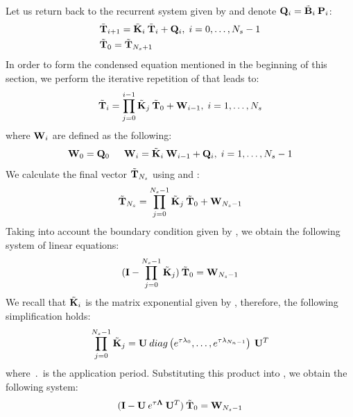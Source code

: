  \label{sec:ce-solution}
Let us return back to the recurrent system given by  and denote \mbox{$\mathbf{Q}_i = \tilde{\mathbf{B}}_i \: \mathbf{P}_i$}:
\begin{align}
  & \tilde{\mathbf{T}}_{i + 1} = \tilde{\mathbf{K}}_i \: \tilde{\mathbf{T}}_i + \mathbf{Q}_i, \; i = 0, \dots, N_s - 1 \label{eq:ce-recurrent} \\
  & \tilde{\mathbf{T}}_0 = \tilde{\mathbf{T}}_{N_s + 1} \nonumber
\end{align}
In order to form the condensed equation mentioned in the beginning of this section, we perform the iterative repetition of  that leads to:
\begin{equation} \label{eq:y-recurrent}
  \tilde{\mathbf{T}}_i = \prod_{j = 0}^{i - 1} \tilde{\mathbf{K}}_j \: \tilde{\mathbf{T}}_0 + \mathbf{W}_{i - 1}, \; i = 1, \dots, N_s
\end{equation}
where $\mathbf{W}_i$ are defined as the following:
\begin{equation}
  \mathbf{W}_0 = \mathbf{Q}_0 \hspace{15pt} \mathbf{W}_i = \tilde{\mathbf{K}}_i \: \mathbf{W}_{i - 1} + \mathbf{Q}_i, \; i = 1, \dots, N_s - 1 \label{eq:p-recurrent}
\end{equation}
We calculate the final vector $\tilde{\mathbf{T}}_{N_s}$ using  and :
\[
  \tilde{\mathbf{T}}_{N_s} = \prod_{j = 0}^{N_s - 1} \tilde{\mathbf{K}}_j \: \tilde{\mathbf{T}}_0 + \mathbf{W}_{N_s - 1}
\]
Taking into account the boundary condition given by , we obtain the following system of linear equations:
\begin{equation} \label{eq:core-system}
  (\mathbf{I} - \prod_{j = 0}^{N_s - 1} \tilde{\mathbf{K}}_j) \: \tilde{\mathbf{T}}_0 = \mathbf{W}_{N_s - 1}
\end{equation}
We recall that $\tilde{\mathbf{K}}_i$ is the matrix exponential given by , therefore, the following simplification holds:
\[
  \prod_{j = 0}^{N_s - 1} \tilde{\mathbf{K}}_j = \mathbf{U} \: diag \left( e^{\tau \lambda_0}, \dots, e^{\tau \lambda_{N_n - 1}} \right) \: \mathbf{U}^T
\]
where $\period$ is the application period. Substituting this product into , we obtain the following system:
\[
  (\mathbf{I} - \mathbf{U} \: e^{\tau \mathbf{\Lambda}} \: \mathbf{U}^T) \: \tilde{\mathbf{T}}_0 = \mathbf{W}_{N_s - 1}
\]
